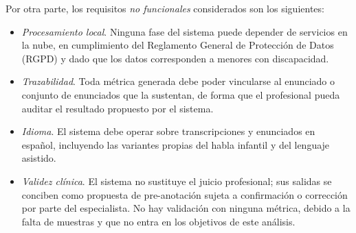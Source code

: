 Por otra parte, los requisitos \emph{no funcionales} considerados son los siguientes:

\begin{itemize}
  \item \emph{Procesamiento local}. Ninguna fase del sistema puede depender de servicios
  en la nube, en cumplimiento del Reglamento General de Protección de Datos (RGPD) y dado
  que los datos corresponden a menores con discapacidad.
  \item \emph{Trazabilidad}. Toda métrica generada debe poder vincularse al enunciado o
  conjunto de enunciados que la sustentan, de forma que el profesional pueda auditar el
  resultado propuesto por el sistema.
  \item \emph{Idioma}. El sistema debe operar sobre transcripciones y enunciados en
  español, incluyendo las variantes propias del habla infantil y del lenguaje asistido.
  \item \emph{Validez clínica}. El sistema no sustituye el juicio profesional; sus salidas
  se conciben como propuesta de pre-anotación sujeta a confirmación o corrección por parte
  del especialista. No hay validación con ninguna métrica, debido a la falta de muestras y
  que no entra en los objetivos de este análisis.
\end{itemize}


